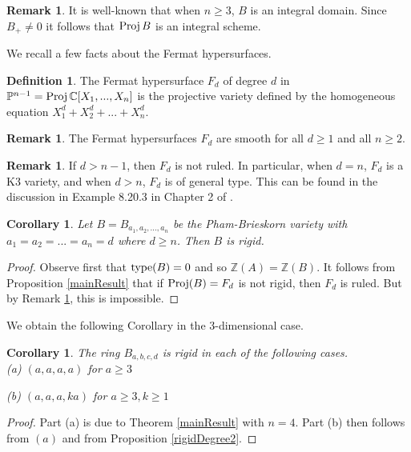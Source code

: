 \documentclass[12pt]{amsart}
\theoremstyle{plain}
\newtheorem{corollary}[subsection]{Corollary}
\theoremstyle{definition}
\newtheorem{definition}[subsection]{Definition}
\newtheorem{remark}[subsection]{Remark}
\newcommand{\Proj}{		\operatorname{{\rm Proj}}}
\newcommand{\type}{		\operatorname{{\rm type}}}
\newcommand{\Integ}{\ensuremath{\mathbb{Z}}}
\newcommand{\Comp}{\ensuremath{\mathbb{C}}}
\newcommand{\proj}{\ensuremath{\mathbb{P}}}
\begin{document}
\begin{remark} It is well-known that when $n \geq 3$, $B$ is an integral domain. Since $B_+ \neq 0$ it follows that $\Proj B$ is an integral scheme.
\end{remark}

We recall a few facts about the Fermat hypersurfaces. 

\begin{definition} The Fermat hypersurface $F_d$ of degree $d$ in $\proj^{n-1} = \Proj \Comp[X_1, ..., X_n]$ is the projective variety defined by the homogeneous equation $X_1^d + X_2^d + ... + X_n^d$.  
\end{definition}

\begin{remark} The Fermat hypersurfaces $F_d$ are smooth for all $d \geq 1$ and all $n \geq 2$. 
\end{remark}
\begin{remark} \label{notRuled}
	If $d > n-1$, then $F_d$ is not ruled. In particular, when $d=n$, $F_d$ is a K3 variety, and when $d > n$, $F_d$ is of general type. This can be found in the discussion in Example 8.20.3 in Chapter 2 of \cite{Hartshorne}. 
\end{remark}	

\begin{corollary} Let $B = B_{a_1,a_2,...,a_n}$ be the Pham-Brieskorn variety with $a_1 = a_2 = ... = a_n = d$ where $d \geq n$. Then $B$ is rigid. 
\end{corollary}

\begin{proof} Observe first that $\type(B) = 0$ and so $\Integ(A) = \Integ(B)$. It follows from Proposition \ref{mainResult} that if $\Proj(B) = F_d$ is not rigid, then $F_d$ is ruled. But by Remark \ref{notRuled}, this is impossible. 
\end{proof}

We obtain the following Corollary in the 3-dimensional case. 

\begin{corollary}
	The ring $B_{a,b,c,d}$ is rigid in each of the following cases.
	\\
	
	(a) $(a,a,a,a)$ for $a \geq 3$
	
	(b) $(a,a,a,ka)$ for $a \geq 3, k \geq 1$
\end{corollary}
\begin{proof}
	Part (a) is due to Theorem \ref{mainResult} with $n = 4$. Part (b) then follows from $(a)$ and from Proposition \ref{rigidDegree2}. 
\end{proof}	
	
        








\end{document}
